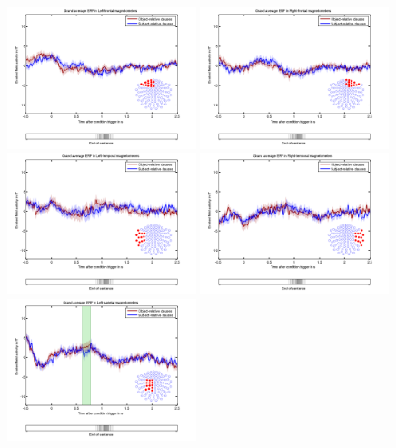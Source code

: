 \begin{figure}[h]
\begin{center}
\vspace{7mm}
\includegraphics[width=0.49\textwidth]{pics/adults_Left-frontal-magnetometers.png}
\includegraphics[width=0.49\textwidth]{pics/adults_Right-frontal-magnetometers.png}
\includegraphics[width=0.49\textwidth]{pics/adults_Left-temporal-magnetometers.png}
\includegraphics[width=0.49\textwidth]{pics/adults_Right-temporal-magnetometers.png}
\includegraphics[width=0.49\textwidth]{pics/adults_Left-parietal-magnetometers.png}

\end{center}
\end{figure}
